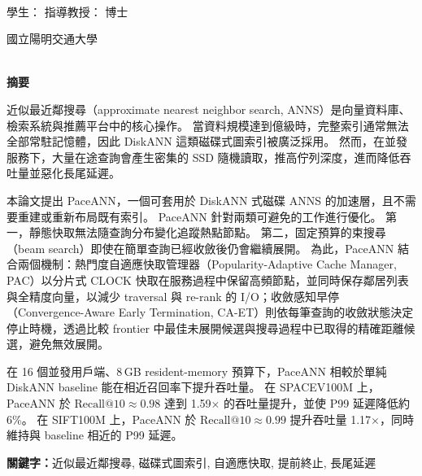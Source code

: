 \begin{center}
    \large
    \begin{singlespace}
        \textbf{\chineseTitle{}} \\[0.5cm]
    \end{singlespace}

    \begin{singlespace}
    學生：\studentCnName\hspace{2.5cm} 指導教授：\advisorCnName\hspace{0.1cm} 博士 \\
    \end{singlespace}

    \vspace{0.5cm}

    \begin{singlespace}
        國立陽明交通大學\\
        \NameofDepartmentInstituteCN\\[0.2cm]
    \end{singlespace}

    \textbf{摘\hspace{1cm}要} \\[0.5cm]
\end{center}

\normalsize

近似最近鄰搜尋（approximate nearest neighbor search, ANNS）是向量資料庫、檢索系統與推薦平台中的核心操作。
當資料規模達到億級時，完整索引通常無法全部常駐記憶體，因此 DiskANN 這類磁碟式圖索引被廣泛採用。
然而，在並發服務下，大量在途查詢會產生密集的 SSD 隨機讀取，推高佇列深度，進而降低吞吐量並惡化長尾延遲。

本論文提出 PaceANN，一個可套用於 DiskANN 式磁碟 ANNS 的加速層，且不需要重建或重新布局既有索引。
PaceANN 針對兩類可避免的工作進行優化。
第一，靜態快取無法隨查詢分布變化追蹤熱點節點。
第二，固定預算的束搜尋（beam search）即使在簡單查詢已經收斂後仍會繼續展開。
為此，PaceANN 結合兩個機制：熱門度自適應快取管理器（Popularity-Adaptive Cache Manager, PAC）以分片式 CLOCK 快取在服務過程中保留高頻節點，並同時保存鄰居列表與全精度向量，以減少 traversal 與 re-rank 的 I/O；收斂感知早停（Convergence-Aware Early Termination, CA-ET）則依每筆查詢的收斂狀態決定停止時機，透過比較 frontier 中最佳未展開候選與搜尋過程中已取得的精確距離候選，避免無效展開。

在 16 個並發用戶端、8\,GB resident-memory 預算下，PaceANN 相較於單純 DiskANN baseline 能在相近召回率下提升吞吐量。
在 SPACEV100M 上，PaceANN 於 $\text{Recall@10}\approx0.98$ 達到 1.59$\times$ 的吞吐量提升，並使 P99 延遲降低約 6\%。
在 SIFT100M 上，PaceANN 於 $\text{Recall@10}\approx0.99$ 提升吞吐量 1.17$\times$，同時維持與 baseline 相近的 P99 延遲。

\vspace{1cm}

\textbf{關鍵字：}近似最近鄰搜尋, 磁碟式圖索引, 自適應快取, 提前終止, 長尾延遲
